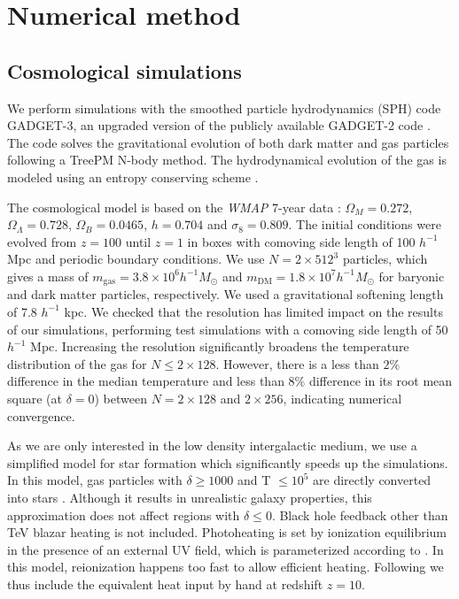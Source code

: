 \documentclass[twocolumns]{emulateapj}
\begin{document}
\section{Numerical method}
\subsection{Cosmological simulations}
We perform simulations with the smoothed particle hydrodynamics (SPH)  code \textsc{GADGET-3}, an upgraded version of the publicly available \textsc{GADGET-2} code \citep{2005MNRAS.364.1105S}. The code solves the gravitational evolution of both dark matter and gas particles following a TreePM N-body method. The hydrodynamical evolution of the gas is modeled using an entropy conserving scheme \citep{2002MNRAS.333..649S}.

The cosmological model is based on the \textit{WMAP} 7-year data \citep{2011ApJS..192...18K}: $\Omega_M=0.272$, $\Omega_{\Lambda}=0.728$, $\Omega_{B}= 0.0465$, $h=0.704$ and $\sigma_8=0.809$. The initial conditions were evolved from $z=100$ until $z=1$ in boxes with  comoving side length of 100 $h^{-1}$ Mpc and periodic boundary conditions. We use $N= 2\times 512^3$ particles, which gives a mass of $m_\mathrm{gas}=3.8\times10^{6} h^{-1} M_{\odot}$ and $m_\mathrm{DM}=1.8\times 10^{7} h^{-1} M_{\odot}$ for baryonic and dark matter particles, respectively. We used  a gravitational softening length of 7.8 $h^{-1}$ kpc.  We checked that the resolution has limited impact on the results of our simulations, performing test simulations with a comoving side length of  50 $h^{-1}$ Mpc.  Increasing the resolution significantly broadens  the temperature distribution of the gas for $N\leqslant 2\times 128$. However, there is a less than $2\%$ difference in the median temperature and less than $8\%$ difference in its root mean square (at $\delta=0$) between $N=2\times 128$ and $2\times 256$, indicating numerical convergence.

As we are only interested in the low density intergalactic medium, we use a simplified model for star formation which significantly speeds up the simulations. In this model, gas particles with $\delta\geq 1000$ and T $\leq 10^5$ are directly converted into stars \citep{2004MNRAS.354..684V}. Although it results in unrealistic galaxy properties, this approximation does not affect regions with $\delta \leq 0$.  Black hole feedback other than TeV blazar heating is not included. Photoheating is set by ionization equilibrium in the presence of an external UV field, which is parameterized according to \citet{2009ApJ...703.1416F}. In this model, reionization happens too fast to allow efficient heating. Following \citet{2012MNRAS.423..149P} we thus include the equivalent heat input by hand at redshift $z=10$.
\end{document}
